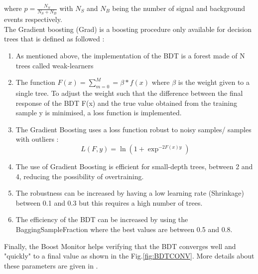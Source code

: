 \documentclass{cernatlasnote}
\begin{document}
\begin{appendices}
\begin{equation}
\end{equation}
 where $p = \frac{N_{S}}{N_{S}+N_{B}}$ with $N_{S}$ and $N_{B}$ being the number of signal and background events respectively.\\
 The Gradient boosting (Grad) is a boosting procedure only available for decision trees that is defined as followed :\\
 \begin{enumerate}
     \item As mentioned above, the implementation of the BDT is a forest made of N trees called weak-learners
     \item The function $F(x)= \sum^{M}_{m=0} = \beta * f(x)$ where $\beta$ is the weight given to a single tree. To adjust the weight such that the difference between the final response of the BDT F(x) and the true value obtained from the training sample y is minimised, a loss function is implemented.
     \item The Gradient Boosting uses a loss function robust to noisy samples/ samples with outliers :  \\
     \begin{equation}
         L(F,y) = \ln{(1+\exp^{-2F(x)y})}
     \end{equation}
     \item The use of Gradient Boosting is efficient for small-depth trees, between 2 and 4, reducing the possibility of overtraining. 
     \item The robustness can be increased by having a low learning rate (Shrinkage) between 0.1 and 0.3 but this requires a high number of trees.
     \item The efficiency of the BDT can be increased by using the BaggingSampleFraction where the best values are between 0.5 and 0.8.
 \end{enumerate}

Finally, the Boost Monitor helps verifying that the BDT converges well and "quickly" to a final value as shown in the Fig.\ref{fig:BDTCONV}. More details about these parameters are given in \cite{TMVA}.
\FloatBarrier


\end{appendices}
\end{document}
